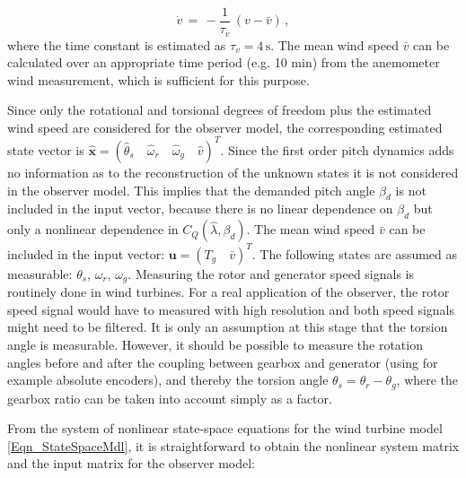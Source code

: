 \documentclass[a4paper]{article}
\newcommand{\xhat}{\widehat{x}}
\newcommand{\B}[1]{\mathbf{#1}}
\begin{document}
\begin{equation}
\dot{v} \, = \, -\frac{1}{\tau_v} \,\left(v - \bar{v}\right)  \, ,
\label{Eq_v_mdl}
\end{equation}
\newline where the time constant is estimated as $\tau_v = 4\,\text{s}$. The mean wind speed $\bar{v}$ can be calculated over an appropriate time period (e.g. 10 min) from the anemometer wind measurement, which is sufficient for this purpose.


Since only the rotational and torsional degrees of freedom plus the estimated wind speed are considered for the observer model, the corresponding estimated state vector is
\newline $\B{\xhat} = \left(\hat{\theta}_s \quad \hat{\omega}_r \quad \hat{\omega}_g \quad \hat{v} \right)^T$. Since the first order pitch dynamics adds no information as to the reconstruction of the unknown states it is not considered in the observer model. This implies that the demanded pitch angle $\beta_d$ is not included in the input vector, because there is no linear dependence on $\beta_d$ but only a nonlinear dependence in $C_Q\left(\hat{\lambda}, \beta_d\right)$.
The mean wind speed $\bar{v}$ can be included in the input vector: $\B{u} = \left(T_g \quad \bar{v}\right)^T$.
The following states are assumed as measurable: $\theta_s$, $\omega_r$, $\omega_g$. Measuring the rotor and generator speed signals is routinely done in wind turbines. For a real application of the observer, the rotor speed signal would have to measured with high resolution and both speed signals might need to be filtered. It is only an assumption at this stage that the torsion angle is measurable. However, it should be possible to measure the rotation angles before and after the coupling between gearbox and generator (using for example absolute encoders), and thereby the torsion angle $\theta_s = \theta_r - \theta_g$, where the gearbox ratio can be taken into account simply as a factor.

From the system of nonlinear state-space equations for the wind turbine model \eqref{Eqn_StateSpaceMdl}, it is straightforward to obtain the nonlinear system matrix and the input matrix for the observer model:
\end{document}
